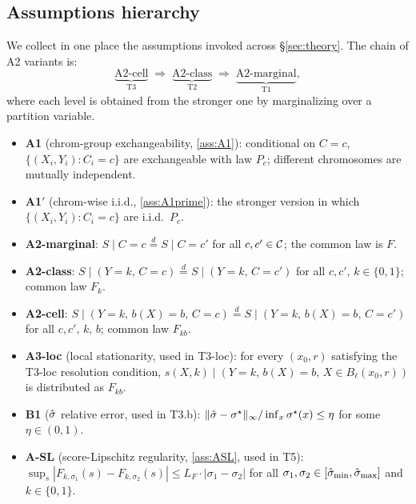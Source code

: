 
\subsection{Assumptions hierarchy}
\label{app:proofs:assumptions}

We collect in one place the assumptions invoked across \S\ref{sec:theory}. The chain of A2 variants is:
\[
\underbrace{\text{A2-cell}}_{\text{T3}} \;\Longrightarrow\; \underbrace{\text{A2-class}}_{\text{T2}} \;\Longrightarrow\; \underbrace{\text{A2-marginal}}_{\text{T1}},
\]
where each level is obtained from the stronger one by marginalizing over a partition variable.

\begin{itemize}
    \item \textbf{A1} (chrom-group exchangeability, \ref{ass:A1}): conditional on $C = c$, $\{(X_i, Y_i) : C_i = c\}$ are exchangeable with law $P_c$; different chromosomes are mutually independent.
    \item \textbf{A1$'$} (chrom-wise i.i.d., \ref{ass:A1prime}): the stronger version in which $\{(X_i, Y_i) : C_i = c\}$ are i.i.d.\ $P_c$.
    \item \textbf{A2-marginal}: $S \mid C = c \overset{d}{=} S \mid C = c'$ for all $c, c' \in \mathcal{C}$; the common law is $F$.
    \item \textbf{A2-class}: $S \mid (Y = k,\, C = c) \overset{d}{=} S \mid (Y = k,\, C = c')$ for all $c, c',\, k \in \{0,1\}$; common law $F_k$.
    \item \textbf{A2-cell}: $S \mid (Y = k,\, b(X) = b,\, C = c) \overset{d}{=} S \mid (Y = k,\, b(X) = b,\, C = c')$ for all $c, c',\, k,\, b$; common law $F_{kb}$.
    \item \textbf{A3-loc} (local stationarity, used in T3-loc): for every $(x_0, r)$ satisfying the T3-loc resolution condition, $s(X, k) \mid (Y = k,\, b(X) = b,\, X \in B_\ell(x_0, r))$ is distributed as $F_{kb}$.
    \item \textbf{B1} ($\hat{\sigma}$ relative error, used in T3.b): $\|\hat{\sigma} - \sigma^\star\|_\infty / \inf_x \sigma^\star(x) \leq \eta$ for some $\eta \in (0, 1)$.
    \item \textbf{A-SL} (score-Lipschitz regularity, \ref{ass:ASL}, used in T5): $\sup_{s} |F_{k,\sigma_1}(s) - F_{k,\sigma_2}(s)| \leq L_F \cdot |\sigma_1 - \sigma_2|$ for all $\sigma_1, \sigma_2 \in [\hat{\sigma}_{\min}, \hat{\sigma}_{\max}]$ and $k \in \{0,1\}$.
\end{itemize}

